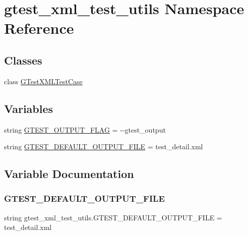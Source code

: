 \hypertarget{namespacegtest__xml__test__utils}{}\section{gtest\+\_\+xml\+\_\+test\+\_\+utils Namespace Reference}
\label{namespacegtest__xml__test__utils}
\subsection*{Classes}
\begin{DoxyCompactItemize}
\item 
class \hyperlink{classgtest__xml__test__utils_1_1_g_test_x_m_l_test_case}{G\+Test\+X\+M\+L\+Test\+Case}
\end{DoxyCompactItemize}
\subsection*{Variables}
\begin{DoxyCompactItemize}
\item 
string \hyperlink{namespacegtest__xml__test__utils_aa354c3ca453d90f496f4cbc576406fb2}{G\+T\+E\+S\+T\+\_\+\+O\+U\+T\+P\+U\+T\+\_\+\+F\+L\+AG} = \textquotesingle{}-\/-\/gtest\+\_\+output\textquotesingle{}
\item 
string \hyperlink{namespacegtest__xml__test__utils_aebe969ed368778716d0619214ff7b853}{G\+T\+E\+S\+T\+\_\+\+D\+E\+F\+A\+U\+L\+T\+\_\+\+O\+U\+T\+P\+U\+T\+\_\+\+F\+I\+LE} = \textquotesingle{}test\+\_\+detail.\+xml\textquotesingle{}
\end{DoxyCompactItemize}


\subsection{Variable Documentation}
\mbox{\label{namespacegtest__xml__test__utils_aebe969ed368778716d0619214ff7b853}} 
\subsubsection{\texorpdfstring{G\+T\+E\+S\+T\+\_\+\+D\+E\+F\+A\+U\+L\+T\+\_\+\+O\+U\+T\+P\+U\+T\+\_\+\+F\+I\+LE}{GTEST\_DEFAULT\_OUTPUT\_FILE}}
{\footnotesize\ttfamily string gtest\+\_\+xml\+\_\+test\+\_\+utils.\+G\+T\+E\+S\+T\+\_\+\+D\+E\+F\+A\+U\+L\+T\+\_\+\+O\+U\+T\+P\+U\+T\+\_\+\+F\+I\+LE = \textquotesingle{}test\+\_\+detail.\+xml\textquotesingle{}}

